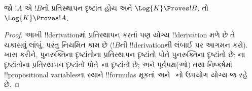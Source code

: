 \documentclass[../../../include/open-logic-section]{subfiles}
\begin{document}
\begin{prop}
  જો $!A$ એ $!B$નો પ્રતિસ્થાપન દૃષ્ટાંત હોય અને $\Log{K} \Proves !B$,
  તો $\Log{K} \Proves !A$.
\end{prop}

\begin{proof}
  આખી !!{derivation}માં પ્રતિસ્થાપન કરતાં પણ યોગ્ય !!{derivation}
  મળે છે તે ચકાસવું લાંબું, પરંતુ નિયમિત કામ છે ($!B$ની
  !!{derivation}ની લંબાઈ પર આગમન કરો). ખાસ કરીને, પુનરુક્તિના
  દૃષ્ટાંતોના પ્રતિસ્થાપન દૃષ્ટાંતો પોતે પુનરુક્તિના દૃષ્ટાંતો છે;
  ના દૃષ્ટાંતોના પ્રતિસ્થાપન
  દૃષ્ટાંતો પોતે~ના દૃષ્ટાંતો છે; અને પૂર્વપક્ષ(ઓ) તથા નિષ્કર્ષમાં
  !!{propositional variable}sના સ્થાને !!{formula}s મૂકતાં \MP{} અને~\Nec{}
  નો ઉપયોગ યોગ્ય જ રહે છે.
\end{proof}
\end{document}
